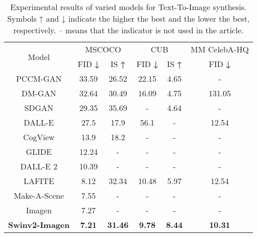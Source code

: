 \documentclass{article}
\begin{document}
\begin{table}[!h]
\centering
\begin{tabular}{|c|c|c|c|c|c|} 
\hline
\multirow{2}{*}{Model} & \multicolumn{2}{c|}{MSCOCO}    & \multicolumn{2}{c|}{CUB}       & MM CelebA-HQ    \\ 
\cline{2-6}
                       & FID \textbf{↓} & IS \textbf{↑} & FID \textbf{↓} & IS \textbf{↑} & FID \textbf{↓}  \\ 
\hline
PCCM-GAN \cite{Qi2021PCCMGANPT}          & 33.59          & 26.52         & 22.15          & 4.65          & -               \\ 
\hline
DM-GAN \cite{Zhu2019DMGANDM}             & 32.64          & 30.49         & 16.09          & 4.75          & 131.05          \\ 
\hline
SDGAN \cite{Zhang2021CrossModalCL}             & 29.35          & 35.69         & -              & 4.64          & -               \\ 
\hline
DALL-E \cite{Zhang2021CrossModalCL}            & 27.5           & 17.9          & 56.1           & -             & 12.54           \\ 
\hline
CogView \cite{Ding2021CogViewMT}           & 13.9           & 18.2          & -              & -             & -               \\ 
\hline
GLIDE \cite{Nichol2022GLIDETP}             & 12.24          & -             & -              & -             & -               \\ 
\hline
DALL-E 2 \cite{Ramesh2022HierarchicalTI}           & 10.39          & -             & -              & -             & -               \\ 
\hline
LAFITE \cite{Zhou2022TowardsLT}            & 8.12           & 32.34         & 10.48          & 5.97          & 12.54           \\ 
\hline
Make-A-Scene \cite{Gafni2022MakeASceneST}      & 7.55           & -             & -              & -             & -               \\ 
\hline
Imagen \cite{Saharia2022PhotorealisticTD}             & 7.27           & -             & -              & -             & -               \\ 
\hline
{\bfseries Swinv2-Imagen}          & {\bfseries 7.21}          & {\bfseries 31.46}         & {\bfseries 9.78}           & {\bfseries 8.44}          & {\bfseries 10.31}           \\
\hline
\end{tabular}
\caption{Experimental results of varied models for Text-To-Image synthesis. Symbols ↑ and ↓ indicate the higher the best and the lower the best, respectively. – means that the indicator is not used in the article.}
\label{tab:evaluation}
\end{table}
\end{document}
